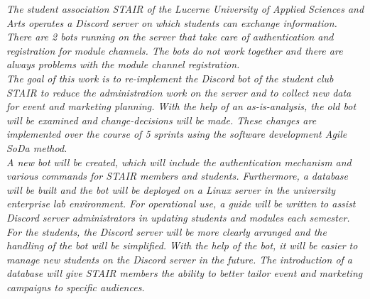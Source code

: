 \documentclass[a4paper, table]{article}
\begin{document}
\textit{
    The student association STAIR of the Lucerne University of Applied Sciences and Arts operates a Discord server on which students can exchange information. 
    There are 2 bots running on the server that take care of authentication and registration for module channels. 
    The bots do not work together and there are always problems with the module channel registration.\\
    The goal of this work is to re-implement the Discord bot of the student club STAIR to reduce the administration work on the server and to collect new data for event and marketing planning.
    With the help of an as-is-analysis, the old bot will be examined and change-decisions will be made.
    These changes are implemented over the course of 5 sprints using the software development Agile \gls{SoDa} method.\\
    A new bot will be created, which will include the authentication mechanism and various commands for STAIR members and students. 
    Furthermore, a database will be built and the bot will be deployed on a Linux server in the university enterprise lab environment. 
    For operational use, a guide will be written to assist Discord server administrators in updating students and modules each semester. 
    For the students, the Discord server will be more clearly arranged and the handling of the bot will be simplified. 
    With the help of the bot, it will be easier to manage new students on the Discord server in the future. 
    The introduction of a database will give STAIR members the ability to better tailor event and marketing campaigns to specific audiences.}

\newpage
\printnoidxglossaries


\newpage
\tableofcontents

\newpage
\end{document}
